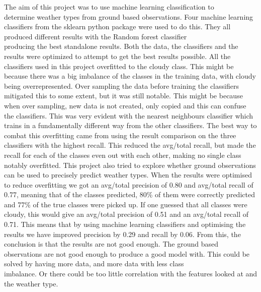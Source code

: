 \documentclass[12pt]{article}
\begin{document}
The aim of this project was to use machine learning classification to \\ determine weather types from ground based observations. Four machine learning classifiers from the sklearn python package were used to do this. They all produced different results with the Random forest classifier \\ producing the best standalone results. Both the data, the classifiers and the results were optimized to attempt to get the best results possible. All the classifiers used in this project overfitted to the cloudy class. This might be because there was a big imbalance of the classes in the training data, with cloudy being overrepresented. Over sampling the data before training the classifiers mitigated this to some extent, but it was still notable. This might be because when over sampling, new data is not created, only copied and this can confuse the classifiers. This was very evident with the nearest neighbours classifier which trains in a fundamentally different way from the other classifiers. The best way to combat this overfitting came from using the result comparison on the three classifiers with the highest recall. This reduced the avg/total recall, but made the recall for each of the classes even out with each other, making no single class notably overfitted. 
\newline \newline
This project also tried to explore whether ground observations can be used to precisely predict weather types. When the results were optimised to reduce overfitting we got an avg/total precision of 0.80 and avg/total recall of 0.77, meaning that of the classes predicted, 80\% of them were correctly predicted and 77\% of the true classes were picked up. If one guessed that all classes were cloudy, this would give an avg/total precision of 0.51 and an avg/total recall of 0.71. This means that by using machine learning classifiers and optimising the results we have improved precision by 0.29 and recall by 0.06.  From this, the conclusion is that the results are not good enough. The ground based observations are not good enough to produce a good model with. This could be solved by having more data, and more data with less class \\ imbalance. Or there could be too little correlation with the features looked at and the weather type.



\newpage
\end{document}

